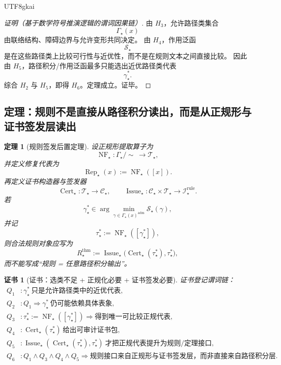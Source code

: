 \documentclass[12pt]{article}
\newtheorem{theorem}{定理}[section]
\newtheorem{Certificate}{证书}[section]
\newcommand{\Cert}{\operatorname{Cert}}
\newcommand{\Issue}{\operatorname{Issue}}
\begin{document}
\begin{CJK*}{UTF8}{gkai}
\begin{proof}[证明（基于数学符号推演逻辑的谓词因果链）]
由 $H_3$，允许路径类集合
\[
  \Gamma_\star(x)
\]
由联络结构、障碍边界与允许变形共同决定。
由 $H_4$，作用泛函
\[
  \mathcal S_\star
\]
是在这些路径类上比较可行性与近优性，而不是在规则文本之间直接比较。
因此由 $H_5$，路径积分/作用泛函最多只能选出近优路径类代表
\[
  \gamma_\star^\ast.
\]
综合 $H_2$ 与 $H_5$，即得 $H_6$。定理成立。证毕。
\end{proof}

\subsection{定理：规则不是直接从路径积分读出，而是从正规形与证书签发层读出}
\label{subsec:tex37-ch12-thm3}

\begin{theorem}[规则签发后置定理]
\label{thm:tex37-ch12-issue}
设正规形提取算子为
\[
  \operatorname{NF}_\star:\Gamma_\star/\!\sim\ \to \mathcal T_\star,
\]
并定义修复代表为
\[
  \operatorname{Rep}_\star(x):=\operatorname{NF}_\star([x]).
\]
再定义证书构造器与签发器
\[
  \Cert_\star:\mathcal T_\star\to \mathcal C_\star,
  \qquad
  \Issue_\star:\mathcal C_\star\times \mathcal T_\star\to \mathcal I_\star^{\mathrm{rule}}.
\]
若
\[
  \gamma_\star^\ast
  \in
  \arg\min_{\gamma\in\Gamma_\star(x)^{\mathrm{adm}}}\mathcal S_\star(\gamma),
\]
并记
\[
  \tau_\star^\ast:=\operatorname{NF}_\star([\gamma_\star^\ast]),
\]
则合法规则对象应写为
\[
  R_\star^{\mathrm{thm}}
  :=
  \Issue_\star\bigl(\Cert_\star(\tau_\star^\ast),\tau_\star^\ast\bigr),
\]
而不能写成“规则 = 任意路径积分输出”。
\end{theorem}

\begin{Certificate}[证书：选类不足 + 正规化必要 + 证书签发必要]
\label{cert:tex37-ch12-issue}
证书登记谓词链：
\[
\begin{aligned}
  Q_1 &: \gamma_\star^\ast\ \text{只是允许路径类中的近优代表},\\
  Q_2 &: Q_1\Rightarrow \gamma_\star^\ast\ \text{仍可能依赖具体表象},\\
  Q_3 &: \tau_\star^\ast:=\operatorname{NF}_\star([\gamma_\star^\ast])\Rightarrow \text{得到唯一可比较正规代表},\\
  Q_4 &: \Cert_\star(\tau_\star^\ast)\ \text{给出可审计证书包},\\
  Q_5 &: \Issue_\star(\Cert_\star(\tau_\star^\ast),\tau_\star^\ast)\ \text{才把正规代表提升为规则/定理接口},\\
  Q_6 &: Q_1\wedge Q_3\wedge Q_4\wedge Q_5
  \Rightarrow
  \text{规则接口来自正规形与证书签发层，而非直接来自路径积分层}.
\end{aligned}
\]
\end{Certificate}


\end{CJK*}
\end{document}
